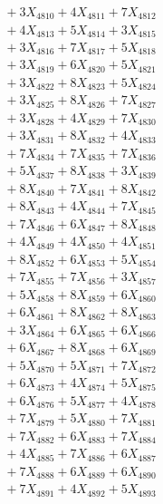 \documentclass[a4paper,10pt]{article}
\begin{document}
{\begin{align}
&\;  + 3 X_{4810} + 4 X_{4811} + 7 X_{4812} \\[0.3ex]
&\;  + 4 X_{4813} + 5 X_{4814} + 3 X_{4815} \\[0.3ex]
&\;  + 3 X_{4816} + 7 X_{4817} + 5 X_{4818} \\[0.3ex]
&\;  + 3 X_{4819} + 6 X_{4820} + 5 X_{4821} \\[0.3ex]
&\;  + 3 X_{4822} + 8 X_{4823} + 5 X_{4824} \\[0.3ex]
&\;  + 3 X_{4825} + 8 X_{4826} + 7 X_{4827} \\[0.3ex]
&\;  + 3 X_{4828} + 4 X_{4829} + 7 X_{4830} \\[0.3ex]
&\;  + 3 X_{4831} + 8 X_{4832} + 4 X_{4833} \\[0.3ex]
&\;  + 7 X_{4834} + 7 X_{4835} + 7 X_{4836} \\[0.3ex]
&\;  + 5 X_{4837} + 8 X_{4838} + 3 X_{4839} \\[0.5ex]\allowbreak
&\;  + 8 X_{4840} + 7 X_{4841} + 8 X_{4842} \\[0.3ex]
&\;  + 8 X_{4843} + 4 X_{4844} + 7 X_{4845} \\[0.3ex]
&\;  + 7 X_{4846} + 6 X_{4847} + 8 X_{4848} \\[0.3ex]
&\;  + 4 X_{4849} + 4 X_{4850} + 4 X_{4851} \\[0.3ex]
&\;  + 8 X_{4852} + 6 X_{4853} + 5 X_{4854} \\[0.3ex]
&\;  + 7 X_{4855} + 7 X_{4856} + 3 X_{4857} \\[0.3ex]
&\;  + 5 X_{4858} + 8 X_{4859} + 6 X_{4860} \\[0.3ex]
&\;  + 6 X_{4861} + 8 X_{4862} + 8 X_{4863} \\[0.3ex]
&\;  + 3 X_{4864} + 6 X_{4865} + 6 X_{4866} \\[0.3ex]
&\;  + 6 X_{4867} + 8 X_{4868} + 6 X_{4869} \\[0.5ex]\allowbreak
&\;  + 5 X_{4870} + 5 X_{4871} + 7 X_{4872} \\[0.3ex]
&\;  + 6 X_{4873} + 4 X_{4874} + 5 X_{4875} \\[0.3ex]
&\;  + 6 X_{4876} + 5 X_{4877} + 4 X_{4878} \\[0.3ex]
&\;  + 7 X_{4879} + 5 X_{4880} + 7 X_{4881} \\[0.3ex]
&\;  + 7 X_{4882} + 6 X_{4883} + 7 X_{4884} \\[0.3ex]
&\;  + 4 X_{4885} + 7 X_{4886} + 6 X_{4887} \\[0.3ex]
&\;  + 7 X_{4888} + 6 X_{4889} + 6 X_{4890} \\[0.3ex]
&\;  + 7 X_{4891} + 4 X_{4892} + 5 X_{4893} \\[0.3ex]

\end{align}}
\end{document}

